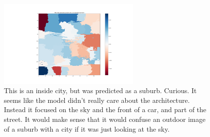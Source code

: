 \begin{figure}[H]
    \includegraphics[width=7cm]{weight-suburb-should-insidecity.png}
    \caption{This is an inside city, but was predicted as a suburb.  Curious. It
    seems like the model didn't really care about the architecture. Instead it
    focused on the sky and the front of a car, and part of the street. It would
    make sense that it would confuse an outdoor image of a suburb with a city if
    it was just looking at the sky. }
    \label{fig:result1}
\end{figure}

